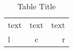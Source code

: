 \documentclass[10pt]{article}
\begin{document}
    \begin{table}
        \caption{Table Title}
        \begin{tabular}{|lc||r|}
            \hline
            text & text & text \\
            l    & c    & r
            \hline
        \end{tabular}
    \end{table}
\end{document}
